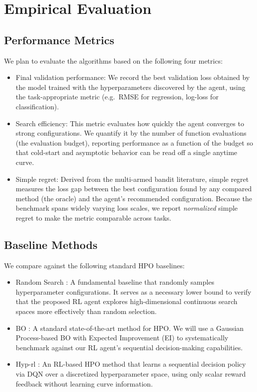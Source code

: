 \section{Empirical Evaluation}
\label{section:evaluation}

\subsection{Performance Metrics}
We plan to evaluate the algorithms based on the following four metrics:
\begin{itemize}
    \item{Final validation performance:} We record the best validation loss obtained by the model trained with the hyperparameters discovered by the agent, using the task-appropriate metric (e.g.\ RMSE for regression, log-loss for classification).
    \item{Search efficiency:} This metric evaluates how quickly the agent converges to strong configurations. We quantify it by the number of function evaluations (the evaluation budget), reporting performance as a function of the budget so that cold-start and asymptotic behavior can be read off a single anytime curve.
    \item{Simple regret:} Derived from the multi-armed bandit literature, simple regret measures the loss gap between the best configuration found by any compared method (the oracle) and the agent's recommended configuration. Because the benchmark spans widely varying loss scales, we report \emph{normalized} simple regret to make the metric comparable across tasks.
\end{itemize}

\subsection{Baseline Methods}
We compare against the following standard HPO baselines:
\begin{itemize}
    \item{Random Search} \citep{bergstra2012random}: A fundamental baseline that randomly samples hyperparameter configurations. It serves as a necessary lower bound to verify that the proposed RL agent explores high-dimensional continuous search spaces more effectively than random selection.
    \item{BO} \citep{snoek2012practical}: A standard state-of-the-art method for HPO. We will use a Gaussian Process-based BO with Expected Improvement (EI) to systematically benchmark against our RL agent's sequential decision-making capabilities.
    \item{Hyp-rl} \citep{jomaa2019hyp}: An RL-based HPO method that learns a sequential decision policy via DQN over a discretized hyperparameter space, using only scalar reward feedback without learning curve information.
\end{itemize}

